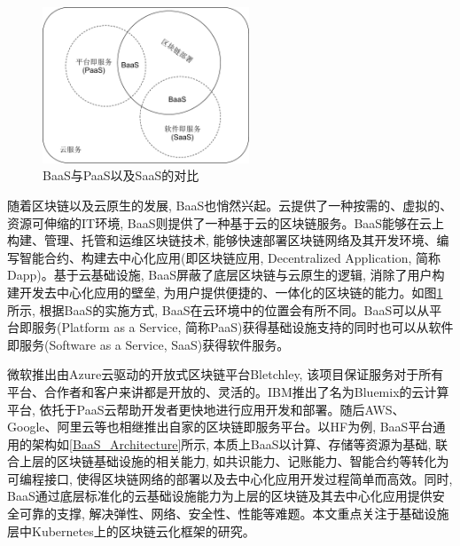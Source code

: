 \begin{figure}[h] %
    \centering %
    \includegraphics[width=0.55\textwidth]{FIGs/chapter2/BaaS_PaaS_SaaS.pdf} %
    \caption{BaaS与PaaS以及SaaS的对比} %
    \label{BaaS_PaaS_SaaS} %
\end{figure}%

随着区块链以及云原生的发展, BaaS也悄然兴起。云提供了一种按需的、虚拟的、资源可伸缩的IT环境, BaaS则提供了一种基于云的区块链服务。BaaS能够在云上构建、管理、托管和运维区块链技术, 能够快速部署区块链网络及其开发环境、编写智能合约、构建去中心化应用(即区块链应用, Decentralized Application, 简称 Dapp)。基于云基础设施, BaaS屏蔽了底层区块链与云原生的逻辑, 消除了用户构建开发去中心化应用的壁垒, 为用户提供便捷的、一体化的区块链的能力。如图\ref{BaaS_PaaS_SaaS}所示, 根据BaaS的实施方式, BaaS在云环境中的位置会有所不同\cite{onik2019performance}。BaaS可以从平台即服务(Platform as a Service, 简称PaaS)获得基础设施支持的同时也可以从软件即服务(Software as a Service, SaaS)获得软件服务。

微软推出由Azure云驱动的开放式区块链平台Bletchley, 该项目保证服务对于所有平台、合作者和客户来讲都是开放的、灵活的\cite{BlockchainasaServiceNextGenerationofCloudServices}。IBM推出了名为Bluemix的云计算平台, 依托于PaaS云帮助开发者更快地进行应用开发和部署。随后AWS、Google、阿里云等也相继推出自家的区块链即服务平台。以HF为例, BaaS平台通用的架构如\ref{BaaS_Architecture}所示, 本质上BaaS以计算、存储等资源为基础, 联合上层的区块链基础设施的相关能力, 如共识能力、记账能力、智能合约等转化为可编程接口, 使得区块链网络的部署以及去中心化应用开发过程简单而高效。同时, BaaS通过底层标准化的云基础设施能力为上层的区块链及其去中心化应用提供安全可靠的支撑, 解决弹性、网络、安全性、性能等难题。本文重点关注于基础设施层中Kubernetes上的区块链云化框架的研究。

